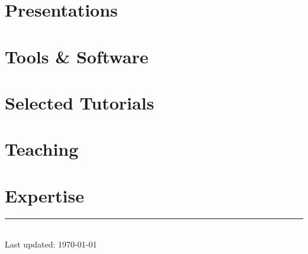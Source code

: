 \documentclass[11pt]{article} %
\begin{document}
\section*{Presentations}
\label{presentations}





\section*{Tools \& Software}
\label{tools}




\section*{Selected Tutorials}
\label{tutorials}



\section*{Teaching}
\label{teaching}



\section*{Expertise}
\label{expertise}


\centering
\rule{0.25\linewidth}{0.4pt}\\
\medskip
Last updated: \today\\
\end{document}
